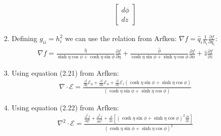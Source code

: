 \documentclass[12pt]{article}
\newcommand{\p}[2]{\frac{\partial #1}{\partial #2}}
\begin{document}
\begin{enumerate}
\begin{enumerate}
\begin{gather*}
\begin{bmatrix}
                    d\phi \\
                    dz
                \end{bmatrix}
            \end{gather*}
            \item Defining $g_{ii}=h_i^2$ we can use the relation from Arfken: $\nabla f=\hat{q}_i\frac{1}{h_i}\p{f}{q_i}$:
            \begin{gather*}
                \nabla f=\frac{\hat{\eta}}{\sinh\eta\cos\phi+\cosh\eta\sin\phi}\p{f}{\eta}+
                \frac{\hat{\phi}}{\cosh\eta\sin\phi+\sinh\eta\cos\phi}\p{f}{\phi}+\hat{z}\p{f}{z}
            \end{gather*}
            \item Using equation (2.21) from Arfken:
            \begin{gather*}
                \nabla\cdot\mathcal{E}=\frac{\p{}{\eta}\mathcal{E}_{\eta}+\p{}{\phi}\mathcal{E}_{\phi}+\p{}{z}\mathcal{E}_{z}(\cosh\eta\sin\phi+\sinh\eta\cos\phi)}{(\cosh\eta\sin\phi+\sinh\eta\cos\phi)}
            \end{gather*}
            \item Using equation (2.22) from Arfken:
            \begin{gather*}
                \nabla^2\cdot\mathcal{E}=\frac{\p{^2f}{\eta^2}+\p{^2f}{\phi^2}+\p{}{z}\left[(\cosh\eta\sin\phi+\sinh\eta\cos\phi)^2\p{f}{z}\right]}{(\cosh\eta\sin\phi+\sinh\eta\cos\phi)^2}
            \end{gather*}
        \end{enumerate}
    \end{enumerate}
\end{document}
